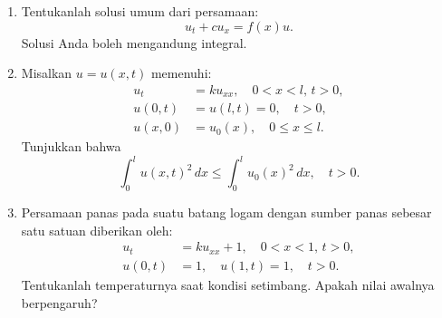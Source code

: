 \documentclass{article}
\begin{document}
\begin{enumerate}
\item Tentukanlah solusi umum dari persamaan:  
\[  
u_t + cu_x = f(x)u.  
\]  
Solusi Anda boleh mengandung integral.  

\item Misalkan \( u = u(x,t) \) memenuhi:  
\begin{align*}  
u_t &= ku_{xx}, \quad 0 < x < l, \, t > 0, \\  
u(0,t) &= u(l,t) = 0, \quad t > 0, \\  
u(x,0) &= u_0(x), \quad 0 \leq x \leq l.  
\end{align*}  
Tunjukkan bahwa  
\[  
\int_0^l u(x,t)^2 \, dx \leq \int_0^l u_0(x)^2 \, dx, \quad t > 0.  
\]  

\item Persamaan panas pada suatu batang logam dengan sumber panas sebesar satu satuan diberikan oleh:  
\begin{align*}  
u_t &= ku_{xx} + 1, \quad 0 < x < 1, \, t > 0, \\  
u(0,t) &= 1, \quad u(1,t) = 1, \quad t > 0.  
\end{align*}  
Tentukanlah temperaturnya saat kondisi setimbang. Apakah nilai awalnya berpengaruh?  
\end{enumerate}
\end{document}
